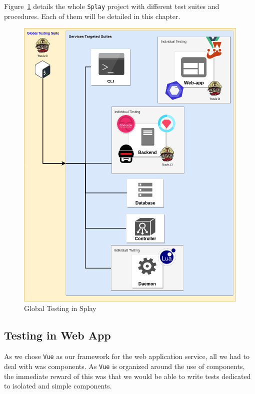 \documentclass{eplmastersthesis}
\begin{document}
      Figure~\ref{global_testing} details the whole \texttt{Splay} project with different
      test suites and procedures. Each of them will be detailed in this chapter.

      \begin{figure}
        \centering
        \includegraphics[scale=0.55]{figures/global_testing.png}
        \caption{\label{global_testing} Global Testing in Splay}
      \end{figure}

      \subsection{Testing in Web App}

        As we chose \texttt{Vue} as our framework for the web application service,
        all we had to deal with was components. As \texttt{Vue} is organized around
        the use of components, the immediate reward of this was that we would
        be able to write tests dedicated to isolated and simple components.
\end{document}
